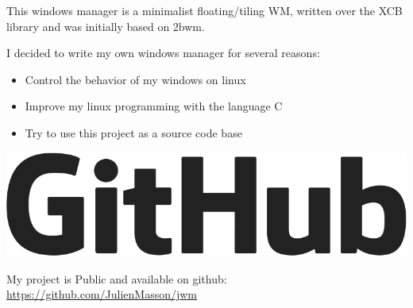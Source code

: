 \documentclass[letterpaper]{jm-cv} %
\begin{document}
\medskip
{}
\medskip

{\large{\color{maingray}\bullet}}

This windows manager is a minimalist floating/tiling WM, written over the XCB library and was initially based on 2bwm.

\begin{minipage}{.7\textwidth}
  I decided to write my own windows manager for several reasons:
  \begin{itemize}
  \item[\color{mainblue}\faArrowRight] Control the behavior of my windows on linux
  \item[\color{mainblue}\faArrowRight] Improve my linux programming with the language C
  \item[\color{mainblue}\faArrowRight] Try to use this project as a source code base
  \end{itemize}
\end{minipage}%
\begin{minipage}{.3\textwidth}
  \center
  \includegraphics[scale=0.08]{logo-github.png}
\end{minipage}
\vspace{0.2cm}

My project is Public and available on github:\\
\href{https://github.com/JulienMasson/jwm}{https://github.com/JulienMasson/jwm}
\end{document}

